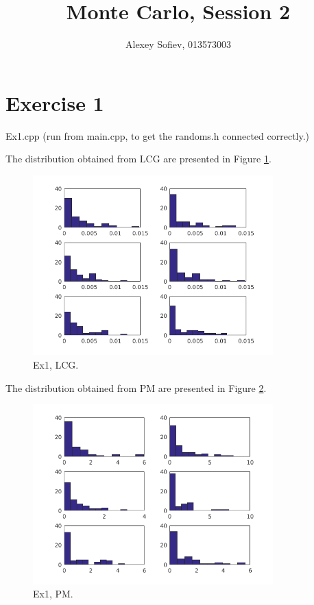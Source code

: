 \documentclass{article}
\begin{document}
\title{Monte Carlo, Session 2}
\author{Alexey Sofiev, 013573003}
\date{}
\maketitle


\section*{Exercise 1}
Ex1.cpp (run from main.cpp, to get the randoms.h connected correctly.)

The distribution obtained from LCG are presented in Figure \ref{fig:ex1lcg}.

\begin{figure}[!hbt]
	\includegraphics[width=350px]{"../Laskari2/ex1_lcg"}
	\caption{Ex1, LCG.}
	\label{fig:ex1lcg}
\end{figure}

The distribution obtained from PM are presented in Figure \ref{fig:ex1pm}.

\begin{figure}[!hbt]
	\includegraphics[width=350px]{"../Laskari2/ex1_pm"}
	\caption{Ex1, PM.}
	\label{fig:ex1pm}
\end{figure}
\end{document}
